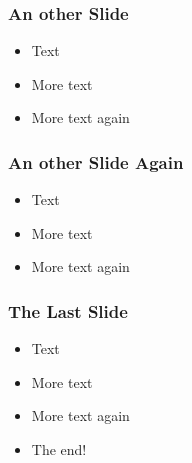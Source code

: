 \begin{frame} 
\frametitle{An other Slide}
  \begin{itemize}
  \item Text
  \item More text
  \item More text again
  \end{itemize}
\end{frame}


\begin{frame} 
\frametitle{An other Slide Again}
  \begin{itemize}
  \item Text
  \item More text
  \item More text again
  \end{itemize}
\end{frame}


\begin{frame} 
\frametitle{The Last Slide}
  \begin{itemize}
  \item Text
  \item More text
  \item More text again
  \item The end!
  \end{itemize}
\end{frame}


